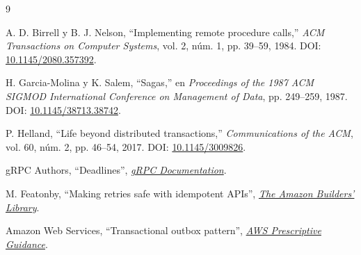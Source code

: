 \documentclass[12pt,a4paper]{article}
\begin{document}
\begin{thebibliography}{9}

A. D. Birrell y B. J. Nelson,
``Implementing remote procedure calls,''
\textit{ACM Transactions on Computer Systems},
vol. 2, núm. 1, pp. 39--59, 1984.
DOI:
\href{https://doi.org/10.1145/2080.357392}
{10.1145/2080.357392}.

H. Garcia-Molina y K. Salem,
``Sagas,''
en \textit{Proceedings of the 1987 ACM SIGMOD
International Conference on Management of Data},
pp. 249--259, 1987.
DOI:
\href{https://doi.org/10.1145/38713.38742}
{10.1145/38713.38742}.

P. Helland,
``Life beyond distributed transactions,''
\textit{Communications of the ACM},
vol. 60, núm. 2, pp. 46--54, 2017.
DOI:
\href{https://doi.org/10.1145/3009826}
{10.1145/3009826}.

gRPC Authors,
``Deadlines'',
\href{https://grpc.io/docs/guides/deadlines/}{\textit{gRPC Documentation}}.

M. Featonby,
``Making retries safe with idempotent APIs'',
\href{https://aws.amazon.com/builders-library/making-retries-safe-with-idempotent-APIs/}{\textit{The Amazon Builders' Library}}.

Amazon Web Services,
``Transactional outbox pattern'',
\href{https://docs.aws.amazon.com/prescriptive-guidance/latest/cloud-design-patterns/transactional-outbox.html}{\textit{AWS Prescriptive Guidance}}.


\end{thebibliography}
\end{document}
